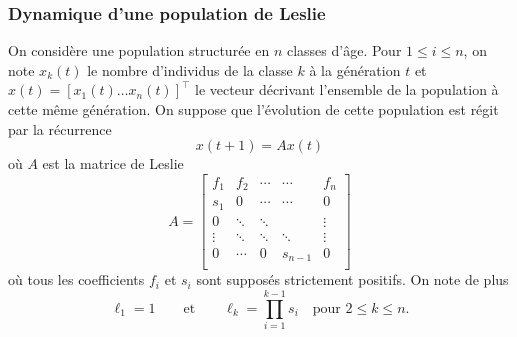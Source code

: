 \subsubsection{Dynamique d'une population de Leslie}


On considère une population structurée en $n$ classes d'âge. Pour $1 \leq i \leq n$, on note $x_k(t)$ le nombre d'individus de la classe $k$ à la génération $t$ et $x(t) = [x_1(t) \dots x_n(t)]^\top$ le vecteur décrivant l'ensemble de la population à cette même génération. On suppose que l'évolution de cette population est régit par la récurrence
\begin{equation} \label{eq:recurrenceLeslie}
  x(t+1) = A x(t)
\end{equation}
où $A$ est la matrice de Leslie
$$
A = \left[\begin{array}{cccccc}
            f_1 & f_2 & \cdots  & \cdots & f_n \\
            s_1 & 0 & \cdots  & \cdots & 0 \\
            0 & \ddots  & \ddots & & \vdots \\
            \vdots & \ddots & \ddots & \ddots & \vdots \\
            0 & \cdots & 0 & s_{n-1} & 0 \\
          \end{array}\right]
$$
où tous les coefficients $f_i$ et $s_i$ sont supposés strictement positifs. On note de plus
$$
\ell_1 = 1 \qquad \text{et} \qquad 
\ell_k = \prod_{i=1}^{k-1} s_i \quad \text{pour $2 \leq k \leq n$}.
$$


